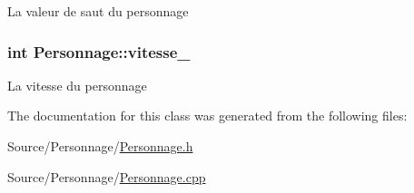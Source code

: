 La valeur de saut du personnage \hypertarget{classPersonnage_aa9527d7da2c71782a3cc222cf54d2ef4}{
\subsubsection[{vitesse\-\_\-}]{\setlength{\rightskip}{0pt plus 5cm}int Personnage\-::vitesse\-\_\-\hspace{0.3cm}{\ttfamily [protected]}}}\label{classPersonnage_aa9527d7da2c71782a3cc222cf54d2ef4}
La vitesse du personnage 

The documentation for this class was generated from the following files\-:\begin{DoxyCompactItemize}
\item 
Source/\-Personnage/\hyperlink{Personnage_8h}{Personnage.\-h}\item 
Source/\-Personnage/\hyperlink{Personnage_8cpp}{Personnage.\-cpp}\end{DoxyCompactItemize}
